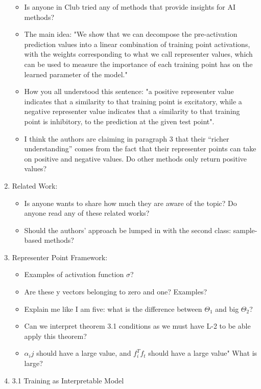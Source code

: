 \documentclass[11pt]{article}
\newcounter{topic} \setcounter{topic}{0}
\begin{document}
\begin{enumerate}
\begin{itemize}
    \item Is anyone in Club tried any of methods that provide insights for AI methods? 
    \item The main idea: "We show that we can decompose the pre-activation prediction values into a linear combination of training point activations, with the weights corresponding to what we call representer values, which can be used to measure the importance of each training point has on the learned parameter of the model."
    \item How you all understood this sentence: "a positive representer value indicates that a similarity to that training point is excitatory, while a negative representer value indicates that a similarity to that training point is inhibitory, to the prediction at the given test point".
    \item I think the authors are claiming in paragraph 3 that their “richer understanding” comes from the fact that their representer points can take on positive and negative values.  Do other methods only return positive values?
\end{itemize}
\item Related Work:
\begin{itemize}
    \item Is anyone wants to share how much they are aware of the topic? Do anyone read any of these related works? 
    \item Should the authors’ approach be lumped in with the second class:  sample-based methods?
\end{itemize}
\item Representer Point Framework:
\begin{itemize}
    \item Examples of activation function $\sigma$? 
    \item Are these y vectors belonging to zero and one? Examples?
    \item Explain me like I am five: what is the difference between $\Theta_1$ and big $\Theta_2$? 
    \item Can we interpret theorem 3.1 conditions as we must have L-2 to be able apply this theorem? 
    \item $\alpha_ij$ should have a large value, and $f_i^Tf_t$ should have a large value" What is large?
\end{itemize}
\item 3.1 Training as Interpretable Model
\begin{itemize}

\end{itemize}
\end{enumerate}
\end{document}
